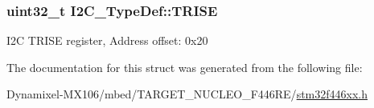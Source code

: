 \subsubsection[{\texorpdfstring{T\+R\+I\+SE}{TRISE}}]{ uint32\+\_\+t I2\+C\+\_\+\+Type\+Def\+::\+T\+R\+I\+SE}\hypertarget{struct_i2_c___type_def_a9f1a5aee4a26b2fb30e08f88586c436d}{}\label{struct_i2_c___type_def_a9f1a5aee4a26b2fb30e08f88586c436d}
I2C T\+R\+I\+SE register, Address offset\+: 0x20 

The documentation for this struct was generated from the following file\+:\begin{DoxyCompactItemize}
\item 
Dynamixel-\/\+M\+X106/mbed/\+T\+A\+R\+G\+E\+T\+\_\+\+N\+U\+C\+L\+E\+O\+\_\+\+F446\+R\+E/\hyperlink{stm32f446xx_8h}{stm32f446xx.\+h}\end{DoxyCompactItemize}
